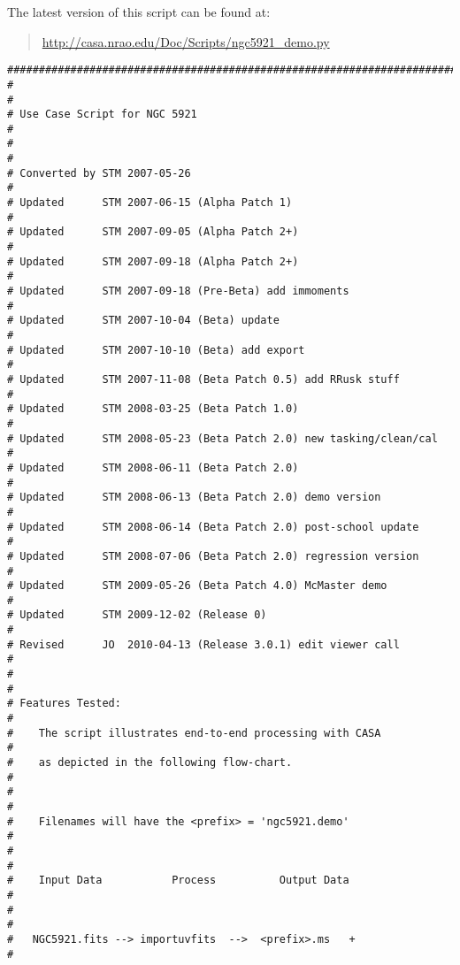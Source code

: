 The latest version of this script can be found at:
\begin{quote}
   \url{http://casa.nrao.edu/Doc/Scripts/ngc5921_demo.py}
\end{quote}

\small
\begin{verbatim}
##########################################################################
#                                                                        #
# Use Case Script for NGC 5921                                           #
#                                                                        #
# Converted by STM 2007-05-26                                            #
# Updated      STM 2007-06-15 (Alpha Patch 1)                            #
# Updated      STM 2007-09-05 (Alpha Patch 2+)                           #
# Updated      STM 2007-09-18 (Alpha Patch 2+)                           #
# Updated      STM 2007-09-18 (Pre-Beta) add immoments                   #
# Updated      STM 2007-10-04 (Beta) update                              #
# Updated      STM 2007-10-10 (Beta) add export                          #
# Updated      STM 2007-11-08 (Beta Patch 0.5) add RRusk stuff           #
# Updated      STM 2008-03-25 (Beta Patch 1.0)                           #
# Updated      STM 2008-05-23 (Beta Patch 2.0) new tasking/clean/cal     #
# Updated      STM 2008-06-11 (Beta Patch 2.0)                           #
# Updated      STM 2008-06-13 (Beta Patch 2.0) demo version              #
# Updated      STM 2008-06-14 (Beta Patch 2.0) post-school update        #
# Updated      STM 2008-07-06 (Beta Patch 2.0) regression version        #
# Updated      STM 2009-05-26 (Beta Patch 4.0) McMaster demo             #
# Updated      STM 2009-12-02 (Release 0)                                #
# Revised      JO  2010-04-13 (Release 3.0.1) edit viewer call           #
#                                                                        #
# Features Tested:                                                       #
#    The script illustrates end-to-end processing with CASA              #
#    as depicted in the following flow-chart.                            #
#                                                                        #
#    Filenames will have the <prefix> = 'ngc5921.demo'                   #
#                                                                        #
#    Input Data           Process          Output Data                   #
#                                                                        #
#   NGC5921.fits --> importuvfits  -->  <prefix>.ms   +                  #

\end{verbatim}
